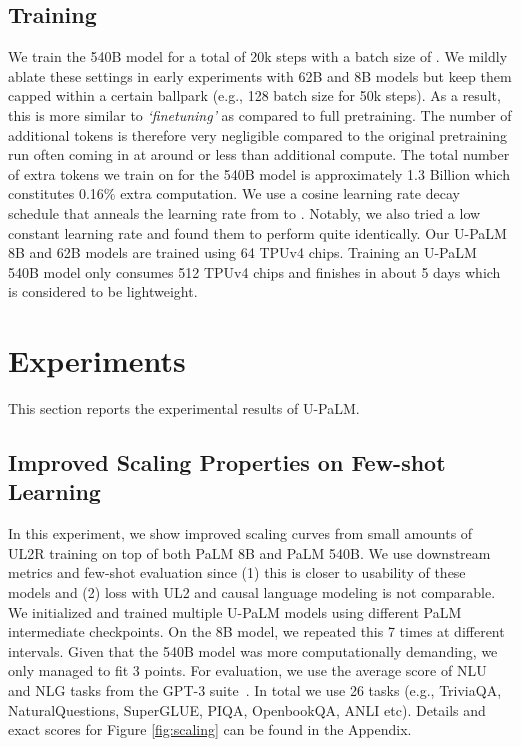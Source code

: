 \documentclass{article}
\newcommand{\methodname}{UL2R\xspace}
\newcommand{\modelname}{U-PaLM\xspace}
\begin{document}
\subsection{Training}
We train the 540B model for a total of 20k steps with a batch size of . We mildly ablate these settings in early experiments with 62B and 8B models but keep them capped within a certain ballpark (e.g., 128 batch size for 50k steps). As a result, this is more similar to \textit{`finetuning'} as compared to full pretraining. The number of additional tokens is therefore very negligible compared to the original pretraining run often coming in at around or less than  additional compute. The total number of extra tokens we train on for the 540B model is approximately 1.3 Billion which constitutes 0.16\% extra computation. We use a cosine learning rate decay schedule that anneals the learning rate from  to . Notably, we  also tried a low constant learning rate and found them to perform quite identically. Our \modelname 8B and 62B models are trained using 64 TPUv4 chips. Training an \modelname 540B model only consumes 512 TPUv4 chips and finishes in about 5 days which is considered to be lightweight.





\section{Experiments}
This section reports the experimental results of \modelname.







\subsection{Improved Scaling Properties on Few-shot Learning}
In this experiment, we show improved scaling curves from small amounts of \methodname training on top of both PaLM 8B and PaLM 540B. We use downstream metrics and few-shot evaluation since (1) this is closer to usability of these models and (2) loss with UL2 and causal language modeling is not comparable. We initialized and trained multiple \modelname models using different PaLM intermediate checkpoints. On the 8B model, we repeated this 7 times at different intervals. Given that the 540B model was more computationally demanding, we only managed to fit 3 points. For evaluation, we use the average score of NLU and NLG tasks from the GPT-3 suite~\citep{brown2020language}. In total we use 26 tasks (e.g., TriviaQA, NaturalQuestions, SuperGLUE, PIQA, OpenbookQA, ANLI etc). Details and exact scores for Figure \ref{fig:scaling} can be found in the Appendix. 
\end{document}

